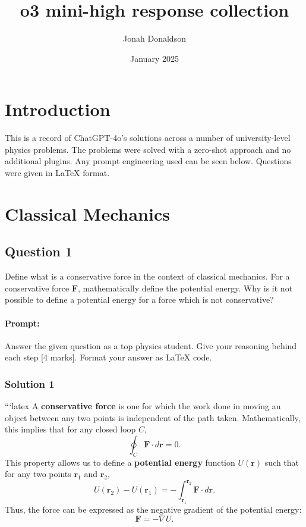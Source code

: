 \documentclass{article}
\title{o3 mini-high response collection}
\author{Jonah Donaldson}
\date{January 2025}
\begin{document}
\maketitle

\tableofcontents
\newpage

\section{Introduction}

This is a record of ChatGPT-4o's solutions across a number of university-level physics problems. The problems were solved with a zero-shot approach and no additional plugins. Any prompt engineering used can be seen below. Questions were given in LaTeX format.

\section{Classical Mechanics}

\subsection{Question 1}
Define what is a conservative force in the context of classical mechanics. For a conservative force $\mathbf{F}$, mathematically define the potential energy. Why is it not possible to define a potential energy for a force which is not conservative?

\paragraph{Prompt: \\} 
Answer the given question as a top physics student. Give your reasoning behind each step [4 marks].
Format your answer as LaTeX code.

\subsubsection{Solution 1}
```latex
A \textbf{conservative force} is one for which the work done in moving an object between any two points is independent of the path taken. Mathematically, this implies that for any closed loop \(C\),
\[
\oint_C \mathbf{F}\cdot d\mathbf{r} = 0.
\]
This property allows us to define a \textbf{potential energy} function \(U(\mathbf{r})\) such that for any two points \(\mathbf{r}_1\) and \(\mathbf{r}_2\),
\[
U(\mathbf{r}_2)-U(\mathbf{r}_1) = -\int_{\mathbf{r}_1}^{\mathbf{r}_2} \mathbf{F}\cdot d\mathbf{r}.
\]
Thus, the force can be expressed as the negative gradient of the potential energy:
\[
\mathbf{F} = -\nabla U.
\]
\end{document}
